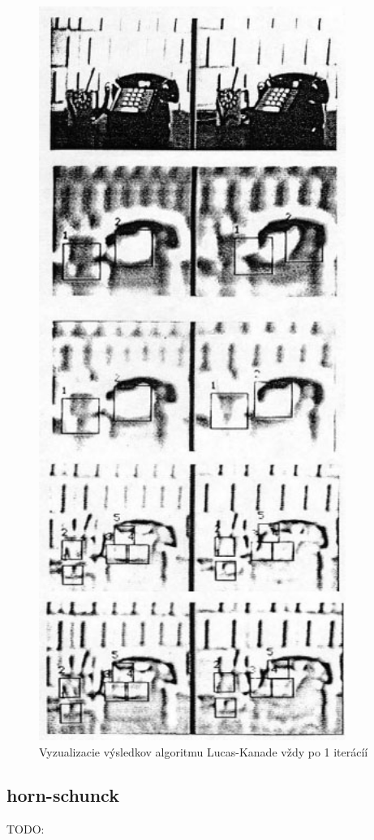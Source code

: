 \begin{figure}[H]
  \centering
  \includegraphics[width=10cm]{pics/lukas-kanade.jpg}
  \caption{Vyzualizacie výsledkov algoritmu Lucas-Kanade vždy po 1 iterácíí}
\end{figure}
\vspace{10mm}

\subsection{horn-schunck}
TODO:

